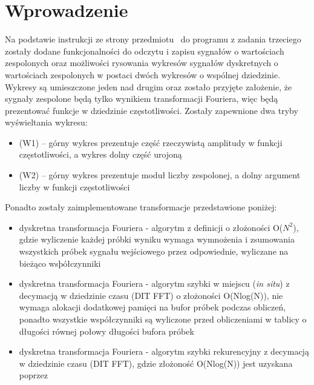 \documentclass[12pt]{article}
\begin{document}
    \section{Wprowadzenie} \label{intro}{
        Na podstawie instrukcji ze strony przedmiotu~\cite{instrukcja}
        do programu z zadania trzeciego zostały dodane funkcjonalności
        do odczytu i zapisu sygnałów o wartościach zespolonych oraz
        możliwości rysowania wykresów sygnałów dyskretnych o
        wartościach zespolonych w postaci dwóch wykresów o wspólnej
        dziedzinie. Wykresy są umieszczone jeden nad drugim oraz
        zostało przyjęte założenie, że sygnały zespolone będą tylko
        wynikiem transformacji Fouriera, więc będą prezentować funkcje
        w dziedzinie częstotliwości.
        Zostały zapewnione dwa tryby wyświeltania wykresu:
        \begin{itemize}
            \item (W1) – górny wykres prezentuje część rzeczywistą
                amplitudy w funkcji częstotliwości, a wykres dolny
                część urojoną
            \item (W2) – górny wykres prezentuje moduł liczby
                zespolonej, a dolny argument liczby w funkcji
                częstotliwości
        \end{itemize}
        Ponadto zostały zaimplementowane transformacje przedstawione
        poniżej: 
        \begin{itemize}
            \item dyskretna transformacja Fouriera - algorytm z
                definicji o złożoności O($N^2$), gdzie wyliczenie
                każdej próbki wyniku wymaga wymnożenia i zsumowania
                wszystkich próbek sygnału wejściowego przez
                odpowiednie, wyliczane na bieżąco wsþółczynniki
            \item dyskretna transformacja Fouriera - algorytm szybki w
                miejscu (\emph{in situ}) z decymacją w dziedzinie
                czasu (DIT FFT) o złożoności O(Nlog(N)), nie wymaga
                alokacji dodatkowej pamięci na bufor próbek podczas
                obliczeń, ponadto wszystkie współczynniki są wyliczone
                przed obliczeniami w tablicy o długości równej połowy
                długości bufora próbek
            \item dyskretna transformacja Fouriera - algorytm szybki
                rekurencyjny z decymacją w dziedzinie czasu (DIT FFT),
                gdzie złożoność O(Nlog(N)) jest uzyskana poprzez

\end{itemize}}
\end{document}
